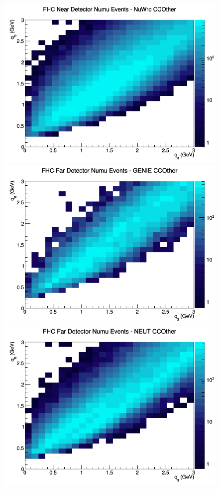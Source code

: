 \begin{figure}[h]
\includegraphics[width=\linewidth]{eff_q0_q3/GAr/CCOther_FHC_ND_numu_q3_q0_NuWro.png}
\endminipage
\newline
{}
\includegraphics[width=\linewidth]{eff_q0_q3/GAr/CCOther_FHC_FD_numu_q3_q0_GENIE.png}
\endminipage
{}
\includegraphics[width=\linewidth]{eff_q0_q3/GAr/CCOther_FHC_FD_numu_q3_q0_NEUT.png}

\end{figure}
